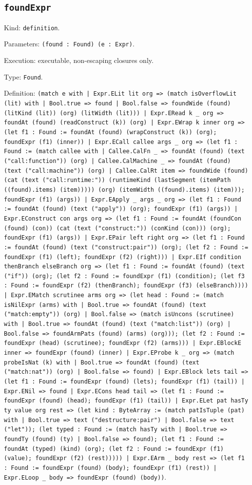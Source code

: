 \documentclass[11pt]{article}
\begin{document}
\subsection*{\texttt{foundExpr}}
\noindent Kind: \texttt{definition}.\par
\noindent Parameters: \texttt{(found : Found) (e : Expr)}.\par
\noindent Execution: executable, non-escaping closures only.\par
\noindent Type: \texttt{Found}.\par
\noindent Definition: \texttt{(match e with | Expr.ELit lit org => (match isOverflowLit (lit) with | Bool.true => found | Bool.false => foundWide (found) (litKind (lit)) (org) (litWidth (lit))) | Expr.ERead k \_ org => foundAt (found) (readConstruct (k)) (org) | Expr.EWrap k inner org => (let f1 : Found := foundAt (found) (wrapConstruct (k)) (org); foundExpr (f1) (inner)) | Expr.ECall callee args \_ org => (let f1 : Found := (match callee with | Callee.CalFn \_ => foundAt (found) (text ("call:function")) (org) | Callee.CalMachine \_ => foundAt (found) (text ("call:machine")) (org) | Callee.CalRt item => foundWide (found) (cat (text ("call:runtime:")) (runtimeKind (lastSegment (itemPath ((found).items) (item))))) (org) (itemWidth ((found).items) (item))); foundExpr (f1) (args)) | Expr.EApply \_ args \_ org => (let f1 : Found := foundAt (found) (text ("apply")) (org); foundExpr (f1) (args)) | Expr.EConstruct con args org => (let f1 : Found := foundAt (foundCon (found) (con)) (cat (text ("construct:")) (conKind (con))) (org); foundExpr (f1) (args)) | Expr.EPair left right org => (let f1 : Found := foundAt (found) (text ("construct:pair")) (org); (let f2 : Found := foundExpr (f1) (left); foundExpr (f2) (right))) | Expr.EIf condition thenBranch elseBranch org => (let f1 : Found := foundAt (found) (text ("if")) (org); (let f2 : Found := foundExpr (f1) (condition); (let f3 : Found := foundExpr (f2) (thenBranch); foundExpr (f3) (elseBranch)))) | Expr.EMatch scrutinee arms org => (let head : Found := (match isNilExpr (arms) with | Bool.true => foundAt (found) (text ("match:empty")) (org) | Bool.false => (match isUncons (scrutinee) with | Bool.true => foundAt (found) (text ("match:list")) (org) | Bool.false => foundArmPats (found) (arms) (org))); (let f2 : Found := foundExpr (head) (scrutinee); foundExpr (f2) (arms))) | Expr.EBlockE inner => foundExpr (found) (inner) | Expr.EProbe k \_ org => (match probeIsNat (k) with | Bool.true => foundAt (found) (text ("match:nat")) (org) | Bool.false => found) | Expr.EBlock lets tail => (let f1 : Found := foundExpr (found) (lets); foundExpr (f1) (tail)) | Expr.ENil => found | Expr.ECons head tail => (let f1 : Found := foundExpr (found) (head); foundExpr (f1) (tail)) | Expr.ELet pat hasTy ty value org rest => (let kind : ByteArray := (match patIsTuple (pat) with | Bool.true => text ("destructure:pair") | Bool.false => text ("let")); (let typed : Found := (match hasTy with | Bool.true => foundTy (found) (ty) | Bool.false => found); (let f1 : Found := foundAt (typed) (kind) (org); (let f2 : Found := foundExpr (f1) (value); foundExpr (f2) (rest))))) | Expr.EArm \_ body rest => (let f1 : Found := foundExpr (found) (body); foundExpr (f1) (rest)) | Expr.ELoop \_ body => foundExpr (found) (body))}.\par
\end{document}
